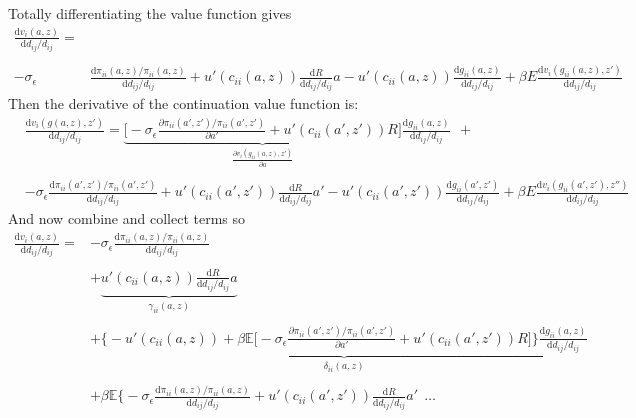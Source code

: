 \documentclass[12pt,pdftex]{article}
\begin{document}
\begin{onehalfspacing}
Totally differentiating the value function gives
\begin{align}
\frac{\mathrm{d} v_i(a, z)}{\mathrm{d} d_{ij} / d_{ij}} =& \nonumber  \\
\nonumber \\
 -\sigma_{\epsilon} & \frac{\mathrm{d} \pi_{ii}(a,z) / \pi_{ii}(a,z)}{\mathrm{d}d_{ij} / d_{ij}}  + u'(c_{ii}(a,z))\frac{\mathrm{d} R}{\mathrm{d} d_{ij} / d_{ij}}a - u'(c_{ii}(a,z))\frac{\mathrm{d} g_{ii}(a,z)}{\mathrm{d} d_{ij} / d_{ij}}
+ \beta E \frac{\mathrm{d} v_i(g_{ii}(a,z), z')}{\mathrm{d} d_{ij} / d_{ij}}
\end{align}
Then the derivative of the continuation value function is:
\begin{align}
& \frac{\mathrm{d} v_i(g(a,z), z')}{\mathrm{d} d_{ij} / d_{ij}} = \underbrace{\bigg [-\sigma_{\epsilon} \frac{\partial \pi_{ii}(a',z') / \pi_{ii}(a',z')}{\partial a'} + u'(c_{ii}(a',z'))R \bigg ]}_{\frac{\partial v_i(g_{ii}(a,z), z')}{\partial a}}\frac{\mathrm{d} g_{ii}(a,z)}{\mathrm{d} d_{ij} / d_{ij}} \ \ + \\
\nonumber \\
& -\sigma_{\epsilon} \frac{\mathrm{d} \pi_{ii}(a',z') / \pi_{ii}(a',z')}{\mathrm{d}d_{ij} / d_{ij}}   + u'(c_{ii}(a',z'))\frac{\mathrm{d} R}{\mathrm{d} d_{ij} / d_{ij}}a' - u'(c_{ii}(a',z'))\frac{\mathrm{d} g_{ii}(a',z')}{\mathrm{d} d_{ij} / d_{ij}}
+ \beta E \frac{\mathrm{d} v_i(g_{ii}(a',z'), z'')}{\mathrm{d} d_{ij} / d_{ij}}
\end{align}
And now combine and collect terms so
\begin{align}
\frac{\mathrm{d} v_i(a, z)}{\mathrm{d} d_{ij} / d_{ij}} =& -\sigma_{\epsilon} \frac{\mathrm{d} \pi_{ii}(a,z) / \pi_{ii}(a,z)}{\mathrm{d}d_{ij} / d_{ij}} \\
\nonumber \\
& + \underbrace{u'(c_{ii}(a,z))\frac{\mathrm{d} R}{\mathrm{d} d_{ij} / d_{ij}}a}_{\gamma_{ii}(a,z)}  \\
\nonumber \\
& + \underbrace{\bigg \{- u'(c_{ii}(a,z)) + \beta \mathbb{E} \big [-\sigma_{\epsilon} \frac{\partial \pi_{ii}(a',z') / \pi_{ii}(a',z')}{\partial a'} + u'(c_{ii}(a',z'))R \big ] \bigg \}\frac{\mathrm{d} g_{ii}(a,z)}{\mathrm{d} d_{ij} / d_{ij}}}_{\delta_{ii}(a,z)} \\
\nonumber \\
& + \beta \mathbb{E} \bigg \{ -\sigma_{\epsilon} \frac{\mathrm{d} \pi_{ii}(a,z) / \pi_{ii}(a,z)}{\mathrm{d}d_{ij} / d_{ij}} +  u'(c_{ii}(a',z'))\frac{\mathrm{d} R}{\mathrm{d} d_{ij} / d_{ij}}a' \ \  \ldots

\end{align}
\end{onehalfspacing}
\end{document}
